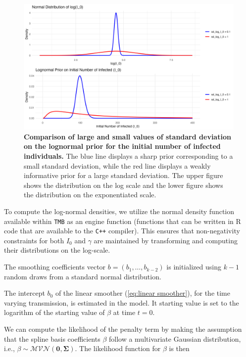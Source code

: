 \documentclass[
11pt, %
oneside, %
english, %
singlespacing, %
]{macthesis} %
\begin{document}
\begin{figure}[H]
\centering
\includegraphics[width=\textwidth, height = 0.5\textwidth]{figure/Other/lognormal_prior.png}
\caption[Distribution of a Log-Normal Prior]{\textbf{Comparison of large and small values of standard deviation on the lognormal prior for the initial number of infected individuals.} The blue line displays a sharp prior corresponding to a small standard deviation, while the red line displays a weakly informative prior for a large standard deviation. The upper figure shows the distribution on the log scale and the lower figure shows the distribution on the exponentiated scale.}
\label{fig:lognormal}
\end{figure}

To compute the log-normal densities, we utilize the normal density function available within \texttt{TMB} as an engine function (functions that can be written in R code that are available to the \texttt{C++} compiler). This ensures that non-negativity constraints for both \(I_0\) and \(\gamma\) are maintained by transforming and computing their distributions on the log-scale.

The smoothing coefficients vector \(b = (b_1, \ldots, b_{k-2})\) is initialized using \(k-1\) random draws from a standard normal distribution.

The intercept \(b_0\) of the linear smoother (\ref{eq:linear smoother}), for the time varying transmission, is estimated in the model. It starting value is set to the logarithm of the starting value of \(\beta\) at time \(t= 0\).

We can compute the likelihood of the penalty term by making the assumption that
the spline basis coefficients \(\beta\) follow a multivariate Gaussian distribution, i.e., \(\beta \sim \mathcal{MVN}(\mathbf{0}, \mathbf{\Sigma})\). The likelihood function for \(\beta\) is then
\end{document}

